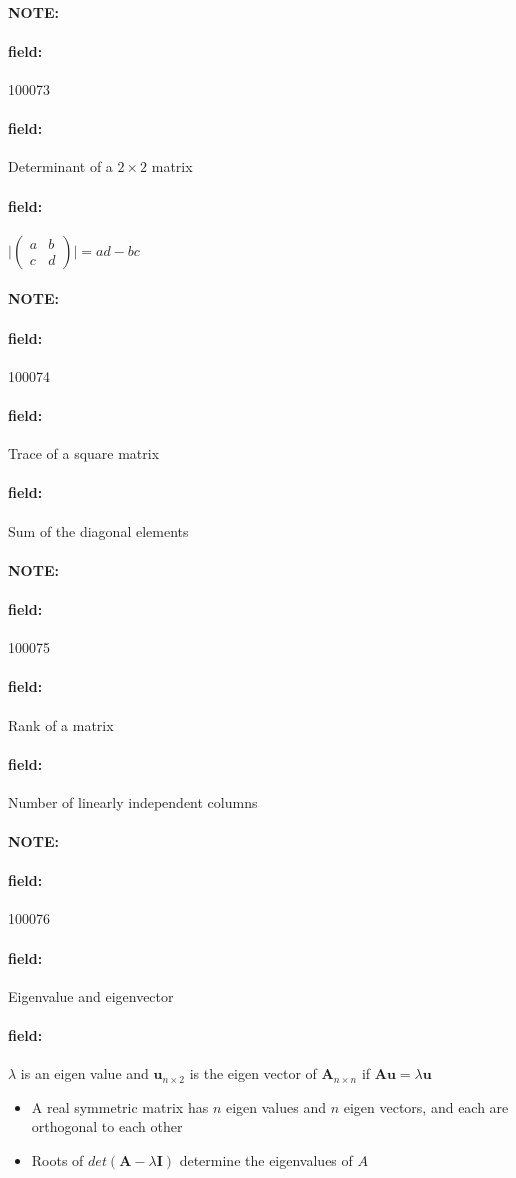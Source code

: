\documentclass[12pt]{article}
\newenvironment{note}{\paragraph{NOTE:}}{}
\newenvironment{field}{\paragraph{field:}}{}
\begin{document}
\begin{note} \begin{field} \tiny 100073 \end{field}
 \begin{field}
  Determinant of a $2\times 2 $ matrix
 \end{field}
 \begin{field}
  $\bigg| \begin{pmatrix}
    a & b \\ c & d
   \end{pmatrix}\bigg| = ad - bc $
 \end{field}
\end{note}

\begin{note} \begin{field} \tiny 100074 \end{field}
 \begin{field}
  Trace of a square matrix
 \end{field}
 \begin{field}
  Sum of the diagonal elements
 \end{field}
\end{note}

\begin{note} \begin{field} \tiny 100075 \end{field}
 \begin{field}
  Rank of a matrix
 \end{field}
 \begin{field}
  Number of linearly independent columns
 \end{field}
\end{note}

\begin{note} \begin{field} \tiny 100076 \end{field}
 \begin{field}
  Eigenvalue and eigenvector
 \end{field}
 \begin{field}
  $\lambda $ is an eigen value and  $\mathbf{u}_{n \times 2}$ is the eigen vector of $\mathbf{A}_{n \times n}$ if $\mathbf{Au} = \lambda \mathbf{u}$
  \begin{itemize}
   \item A real symmetric matrix has $n$ eigen values  and $n$ eigen vectors, and each are orthogonal to each other
   \item Roots of $det(\mathbf{A} - \lambda  \mathbf{I})$ determine the eigenvalues of $A$
  \end{itemize}
 \end{field}
\end{note}
\end{document}
